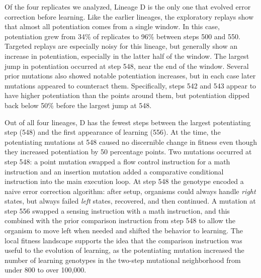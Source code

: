 Of the four replicates we analyzed, Lineage D is the only one that evolved error correction before learning.
Like the earlier lineages, the exploratory replays show that almost all potentiation comes from a single window. 
In this case, potentiation grew from 34\% of replicates to 96\% between steps 500 and 550.
Targeted replays are especially noisy for this lineage, but generally show an increase in potentiation, especially in the latter half of the window.
The largest jump in potentiation occurred at step 548, near the end of the window.
Several prior mutations also showed notable potentiation increases, but in each case later mutations appeared to counteract them. %
Specifically, steps 542 and 543 appear to have higher potentiation than the points around them, but potentiation dipped back below 50\% before the largest jump at 548.

Out of all four lineages, D has the fewest steps between the largest potentiating step (548) and the first appearance of learning (556).
At the time, the potentiating mutations at 548 caused no discernible change in fitness even though they increased potentiation by 50 percentage points. 
Two mutations occurred at step 548: a point mutation swapped a flow control instruction for a math instruction and an insertion mutation added a comparative conditional instruction into the main execution loop. 
At step 548 the genotype encoded a naive error correction algorithm: after setup, organisms could always handle \textit{right} states, but always failed \textit{left} states, recovered, and then continued. 
A mutation at step 556 swapped a sensing instruction with a math instruction, and this combined with the prior comparison instruction from step 548 to allow the organism to move left when needed and shifted the behavior to learning.
The local fitness landscape supports the idea that the comparison instruction was useful to the evolution of learning, as the potentiating mutation increased the number of learning genotypes in the two-step mutational neighborhood from under 800 to over 100,000.

